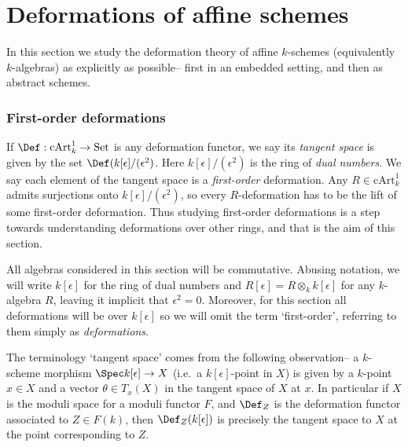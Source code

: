 \section{Deformations of affine schemes}
\label{section-affine-deformation}

In this section we study the deformation theory of affine \(k\)-schemes
(equivalently \(k\)-algebras) as explicitly as possible-- first in an
embedded setting, and then as abstract schemes.  

\subsubsection{First-order deformations} If \(\Def: \text{cArt}^1_k \rightarrow
\text{Set}\) is any deformation functor, we say its \textit{tangent space} is
given by the set \(\Def(k[\epsilon]/(\epsilon^2)\). Here
\(k[\epsilon]/(\epsilon^2)\) is the ring of \textit{dual numbers}. We say each
element of the tangent space is a \textit{first-order} deformation. Any \(R\in
\text{cArt}^1_k\) admits surjections onto \(k[\epsilon]/(\epsilon^2)\), so every
\(R\)-deformation has to be the lift of some first-order deformation. Thus
studying first-order deformations is a step towards understanding deformations
over other rings, and that is the aim of this section.

All algebras considered in this section will be commutative. Abusing notation,
we will write \(k[\epsilon]\) for the ring of dual numbers and
\(R[\epsilon]=R\otimes_k k[\epsilon]\) for any \(k\)-algebra \(R\), leaving it
implicit that \(\epsilon^2=0\). Moreover, for this section all deformations will
be over \(k[\epsilon]\) so we will omit the term `first-order', referring to
them simply as \textit{deformations}. 

\begin{remark}
    The terminology `tangent space' comes from the following observation-- a
    \(k\)-scheme morphism \(\Spec k[\epsilon]\rightarrow X\)
    (i.e.\ a \(k[\epsilon]\)-point in \(X\)) is given by a
    \(k\)-point \(x\in X\) and a vector \(\theta \in T_x(X)\) in the tangent
    space of \(X\) at \(x\). In particular if \(X\) is the moduli space for a
    moduli functor \(F\), and \(\Def_Z\) is the deformation functor associated
    to \(Z\in F(k)\), then \(\Def_Z(k[\epsilon])\) is precisely the
    tangent space to \(X\) at the point corresponding to \(Z\).
\end{remark}

